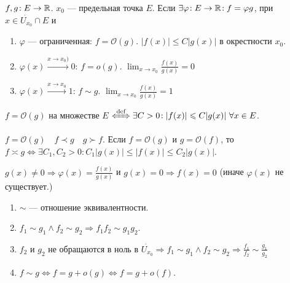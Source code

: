 \begin{definition}
    $f, g\!: E \to \mathbb{R}$.  $x_0$ --- предельная точка  $E$. Если $\exists \varphi\!:E \to \mathbb{R}\!: f = \varphi g$, при $x \in \dot{U_{x_0}} \cap E$ и 
     \begin{enumerate}
         \item $\varphi$ --- ограниченная:  $f = \mathcal{O}(g)$. $|f(x)| \le C|g(x)|$ в окрестности $x_0$.
         \item  $\varphi(x) \xrightarrow{x \to x_0)} 0$:  $f = o(g)$. $\lim_{x \to x_0} \frac{f(x)}{g(x)} = 0$
         \item  $\varphi(x) \xrightarrow{x \to x_0} 1$:  $f \sim g$. $\lim_{x \to x_0} \frac{f(x)}{g(x)} = 1$
    \end{enumerate}
\end{definition}
\begin{definition}
    $f = \mathcal{O}(g)$ на множестве  $E$  $\xLeftrightarrow{\text{def}} \exists C > 0\!: |f(x)| \le C|g(x)|\ \forall x \in E$.
\end{definition}
\begin{definition}
    $f = \mathcal{O}(g) \quad f \prec g \quad g \succ f$. Если  $f = \mathcal{O}(g)$ и  $g = \mathcal{O}(f)$, то  $f \asymp g \iff \exists C_1, C_2 > 0\!: C_1|g(x)| \le |f(x)| \le C_2|g(x)|$.
\end{definition}
\begin{remark}
    $g(x) \neq 0 \Rightarrow \varphi(x) = \frac{f(x)}{g(x)}$ и $g(x) = 0 \Rightarrow f(x) = 0$ (иначе $\varphi(x)$ не существует.)
\end{remark}
\begin{properties}
    \begin{enumerate}
        \item $\sim$ --- отношение эквивалентности.
        \item  $f_1 \sim g_1 \land f_2 \sim g_2 \Rightarrow f_1f_2 \sim g_1g_2$.
        \item $f_2$ и  $g_2$ не обращаются в ноль в  $\dot{U_{x_0}} \Rightarrow f_1 \sim g_1 \land f_2 \sim g_2 \Rightarrow \frac{f_1}{f_2} \sim \frac{g_1}{g_2}$
        \item $f \sim g \iff f = g + o(g) \iff f = g + o(f)$.
    \end{enumerate}
\end{properties}
